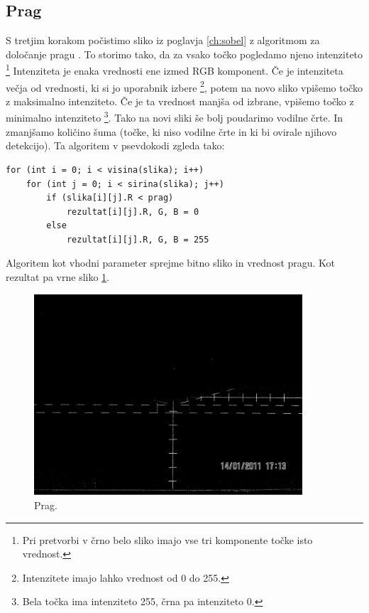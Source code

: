 \documentclass[oneside, a4paper, 12pt]{book}
\begin{document}
\subsection{Prag}
S tretjim korakom počistimo sliko iz poglavja \ref{ch:sobel} z algoritmom za določanje pragu \cite{treshold-wiki}. To storimo tako, da za vsako točko pogledamo njeno intenziteto 
\footnote{Pri pretvorbi v črno belo sliko imajo vse tri komponente točke isto vrednost.} Intenziteta je enaka vrednosti ene izmed RGB komponent. Če je intenziteta večja od vrednosti, ki si jo uporabnik izbere \footnote{Intenzitete imajo lahko vrednost od 0 do 255.}, potem na novo sliko vpišemo točko z maksimalno intenziteto. Če je ta vrednost manjša od izbrane, vpišemo točko z minimalno intenziteto \footnote{Bela točka ima intenziteto 255, črna pa intenziteto 0.}. Tako na novi sliki še bolj poudarimo vodilne črte. In zmanjšamo količino šuma (točke, ki niso vodilne črte in ki bi ovirale njihovo detekcijo). Ta algoritem v psevdokodi zgleda tako:

\begin{verbatim}
for (int i = 0; i < visina(slika); i++)
    for (int j = 0; i < sirina(slika); j++)
        if (slika[i][j].R < prag)
            rezultat[i][j].R, G, B = 0
        else
            rezultat[i][j].R, G, B = 255
\end{verbatim}

Algoritem kot vhodni parameter sprejme bitno sliko in vrednost pragu. Kot rezultat pa vrne sliko \ref{pic:treshold}.

\begin{figure}
\begin{center}
\includegraphics[width=10cm]{slike/treshold.jpg}
\end{center}
\caption{Prag.}
\label{pic:treshold}
\end{figure}
\end{document}
